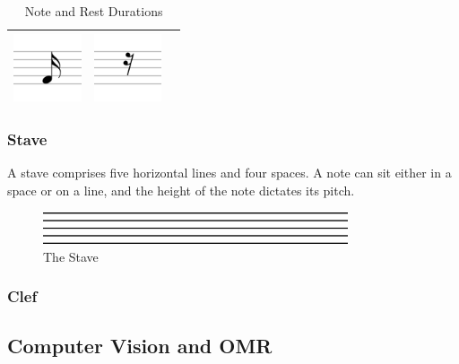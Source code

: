 \begin{table}[h]
\begin{tabular}{| c | c | c |}
                            \includegraphics[width=20mm]{./assets/16th.png}
                            &
                            \includegraphics[width=20mm]{./assets/16threst.png} \\ \hline
                \end{tabular}
                \caption{Note and Rest Durations}
                \label{table:notes}
            \end{table}


               
        \subsubsection{Stave}
            A stave comprises five horizontal lines and four spaces. A note can sit either in a space or on a line, and the height of the note dictates its pitch.
            \begin{figure}[ht!]
            \centering
            \includegraphics[width=90mm]{./assets/staff.png}
            \caption{The Stave}
            \label{stave}
            \end{figure}
        \subsubsection{Clef}


    \subsection{Computer Vision and OMR}
